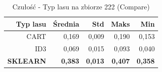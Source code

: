 \begin{table}[htbp]
\centering
\small
\setlength{\tabcolsep}{6pt}
\renewcommand{\arraystretch}{1.2}
\caption{Czułość - Typ lasu na zbiorze 222 (Compare)}
\label{tab:Compare_on_222_recall}
\begin{tabular}{r|r|r|r|r}
\toprule
Typ lasu & Średnia & Std & Maks & Min \\
\hline
CART & 0,169 & 0,009 & 0,190 & 0,153 \\
ID3 & 0,069 & 0,015 & 0,093 & 0,040 \\
\textbf{SKLEARN} & \textbf{0,383} & \textbf{0,013} & \textbf{0,407} & \textbf{0,358} \\
\bottomrule
\end{tabular}
\end{table}